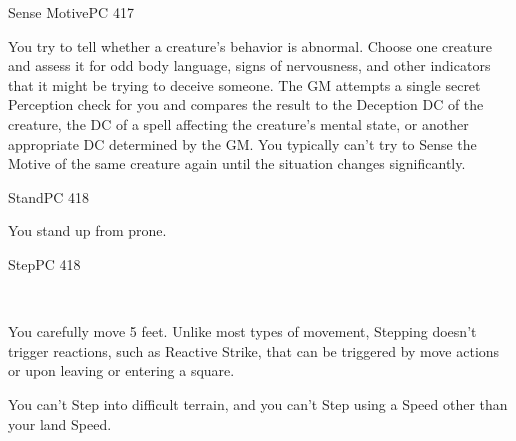 \documentclass[12pt,openany,twocolumn]{book}
\begin{document}
\begin{action}{Sense Motive}{}{PC 417}
    \begin{actioninfo}
    \end{actioninfo}

    \begin{actionbody}
        You try to tell whether a creature's behavior is abnormal. Choose one creature and assess it for odd body language, signs of nervousness, and other indicators that it might be trying to deceive someone. The GM attempts a single secret Perception check for you and compares the result to the Deception DC of the creature, the DC of a spell affecting the creature's mental state, or another appropriate DC determined by the GM. You typically can't try to Sense the Motive of the same creature again until the situation changes significantly.
    \end{actionbody}




\end{action}

\begin{action}{Stand}{}{PC 418}
    \begin{actioninfo}
    \end{actioninfo}

    \begin{actionbody}
        You stand up from prone.
    \end{actionbody}
\end{action}

\begin{action}{Step}{}{PC 418}
    \begin{actioninfo}
         \\
    \end{actioninfo}

    \begin{actionbody}
        You carefully move 5 feet. Unlike most types of movement, Stepping doesn't trigger reactions, such as Reactive Strike, that can be triggered by move actions or upon leaving or entering a square.

        You can't Step into difficult terrain, and you can't Step using a Speed other than your land Speed.
    \end{actionbody}
\end{action}
\end{document}
